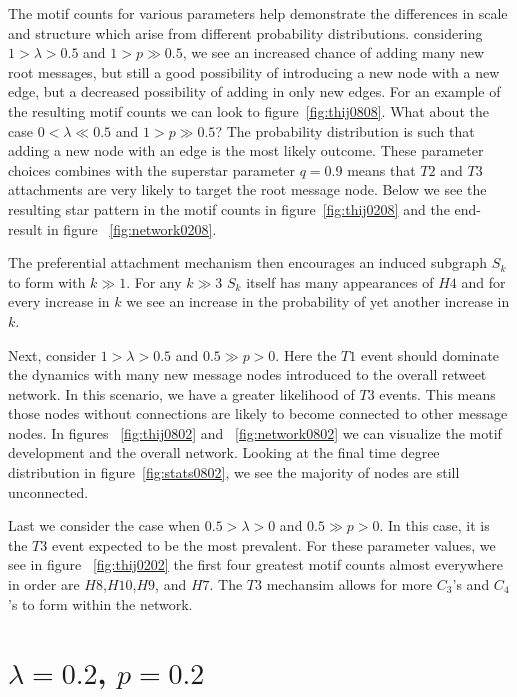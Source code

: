 The motif counts for various parameters help demonstrate the differences in scale 
and structure which arise from different probability distributions. 
considering $1>\lambda>0.5$ and $1>p\gg0.5$, we see an increased chance of adding
many new root messages, but still a good possibility of introducing a new node with a new edge, but a decreased possibility of 
adding in only new edges. For an example of the resulting motif counts we can look to figure~\ref{fig:thij0808}. 
What about the case $0 < \lambda \ll 0.5$ and $1 > p \gg 0.5$? The probability distribution is such that adding a new node
with an edge is the most likely outcome. These parameter choices combines with the superstar parameter $q=0.9$ means that $T2$ and $T3$
attachments are very likely to target the root message node. Below we see the resulting star pattern in the motif counts in figure~\ref{fig:thij0208}
and the end-result in figure ~\ref{fig:network0208}.

The preferential attachment mechanism then encourages
 an induced subgraph $S_{k}$ to form with $k\gg 1$.
 For any $k \gg 3$ $S_{k}$
itself has many appearances of $H4$ and for every increase in $k$ we see an increase in the probability
of yet another increase in $k$.

Next, consider $1>\lambda>0.5$ and $0.5 \gg p > 0$. Here the $T1$ event should dominate the dynamics
 with many new message nodes introduced to the overall retweet network. In this scenario, we have
 a greater likelihood of $T3$ events. This means those nodes without connections are likely to become connected to other message nodes. In figures
 ~\ref{fig:thij0802} and ~\ref{fig:network0802} we can visualize the motif development and the overall network. Looking at the final time degree
 distribution in figure~\ref{fig:stats0802}, we see the majority of nodes are still unconnected.

Last we consider the case when $0.5 > \lambda > 0$ and $0.5 \gg p > 0$. In this case, it is the $T3$ event
 expected to be the most prevalent. For these parameter values, we see in figure ~\ref{fig:thij0202} the first four greatest motif counts almost 
 everywhere in order are $H8$,$H10$,$H9$, and $H7$. The $T3$ mechansim allows for more $C_3$'s and $C_4$'s to form within the network.



\section{$\lambda=0.2$, $p=0.2$}

